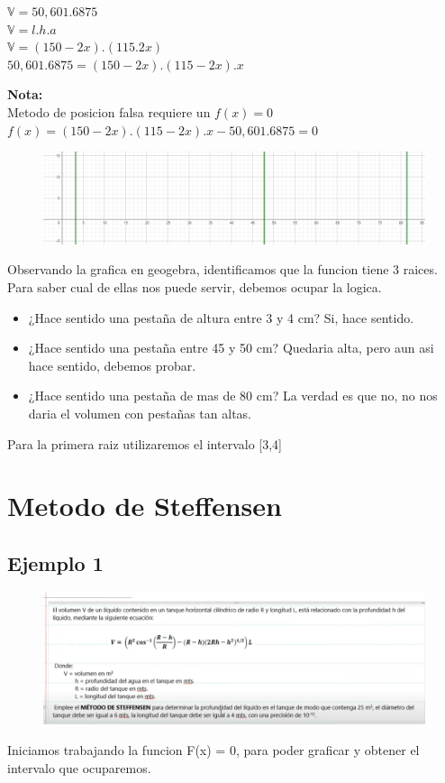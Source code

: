 \documentclass{article}
\theoremstyle{mytheoremstyle}
\theoremstyle{mytheoremstyle}
\theoremstyle{myproblemstyle}
\begin{document}
\noindent $\mathbb{V} = 50,601.6875$
\\$\mathbb{V} = l.h.a$
\\$\mathbb{V} = (150-2x).(115.2x)$
\\$50,601.6875 = (150-2x).(115-2x).x$

\textbf{Nota: }\\Metodo de posicion falsa requiere un $f(x)=0$
\\ $f(x)=(150-2x).(115-2x).x-50,601.6875=0$

\begin{figure}[ht]
    \includegraphics*[scale=0.5]{img/secante2.png}
\end{figure}
Observando la grafica en geogebra, identificamos que la funcion tiene 3 raices. Para saber cual de ellas nos puede servir, debemos ocupar la logica.
\begin{itemize}
    \item ¿Hace sentido una pestaña de altura entre 3 y 4 cm? Si, hace sentido.
    \item ¿Hace sentido una pestaña entre 45 y 50 cm? Quedaria alta, pero aun asi hace sentido, debemos probar.
    \item ¿Hace sentido una pestaña de mas de 80 cm? La verdad es que no, no nos daria el volumen con pestañas tan altas.
\end{itemize}

Para la primera raiz utilizaremos el intervalo [3,4]
\pagebreak
\section*{Metodo de Steffensen}
\subsection*{Ejemplo 1}
\begin{figure}[ht]
    \includegraphics[scale=0.5]{img/stf1.png}
\end{figure}
Iniciamos trabajando la funcion F(x) = 0, para poder graficar y obtener el intervalo que ocuparemos.
\end{document}
